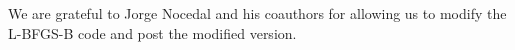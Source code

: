 We are grateful to Jorge Nocedal and his coauthors for allowing us 
to modify the L-BFGS-B code and post the modified version.  







